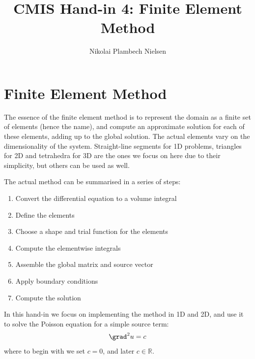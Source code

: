 \documentclass[sigconf]{acmart}
\begin{document}
%
\title{CMIS Hand-in 4: Finite Element Method}

\author{Nikolai Plambech Nielsen}


\maketitle

\section{Finite Element Method}
The essence of the finite element method is to represent the domain as a finite set of elements (hence the name), and compute an approximate solution for each of these elements, adding up to the global solution. The actual elements vary on the dimensionality of the system. Straight-line segments for 1D problems, triangles for 2D and tetrahedra for 3D are the ones we focus on here due to their simplicity, but others can be used as well.

The actual method can be summarised in a series of steps:
\begin{enumerate}
	\item Convert the differential equation to a volume integral
	\item Define the elements
	\item Choose a shape and trial function for the elements
	\item Compute the elementwise integrals
	\item Assemble the global matrix and source vector
	\item Apply boundary conditions
	\item Compute the solution
\end{enumerate}
In this hand-in we focus on implementing the method in 1D and 2D, and use it to solve the Poisson equation for a simple source term:
\begin{equation}\label{key}
	\grad^2 u = c
\end{equation}
where to begin with we set $ c=0 $, and later $ c\in \mathbb{R} $. 
\end{document}
